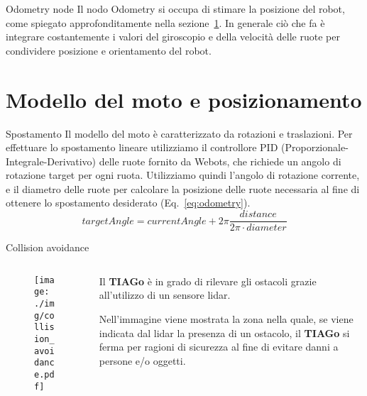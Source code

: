 \documentclass[aspectratio=169, leqno]{beamer}
\begin{document}
	\begin{frame}{Odometry node}
	Il nodo Odometry si occupa di stimare la posizione del
	robot, come spiegato approfonditamente nella
	sezione~\ref{sec:Modello-del-moto-e-posizionamento}. In generale ciò che fa
	è integrare costantemente i valori del giroscopio e della velocità delle
	ruote per condividere posizione e orientamento del robot.
	\end{frame}
	
	

	\section{Modello del moto e posizionamento}\label{sec:Modello-del-moto-e-posizionamento} 
	\frame{\sectionpage}
		
	\begin{frame}{Spostamento}
		Il modello del moto è caratterizzato da rotazioni e traslazioni.
		Per effettuare lo spostamento lineare utilizziamo il controllore PID
		(Proporzionale-Integrale-Derivativo) delle ruote fornito da Webots, che
		richiede un angolo di rotazione target per ogni ruota. Utilizziamo quindi
		l'angolo di rotazione corrente, e il diametro delle ruote per calcolare la
		posizione delle ruote necessaria al fine di ottenere lo spostamento
		desiderato (Eq.~\ref{eq:odometry}).
		\begin{equation}\label{eq:odometry}
		targetAngle =
		currentAngle+2\pi\frac    {distance}
						{2\pi \cdot diameter}
		\end{equation}
	\end{frame}
	
	\begin{frame}{Collision avoidance}
		\begin{columns}
			\begin{column}{0.2\linewidth}
				\begin{figure}[H]
					\centering
					\texttt{[image: ./img/collision\_avoidance.pdf]}
					\label{fig:collision_avoidance}
				\end{figure}
			\end{column}
			\begin{column}{0.8\linewidth}
				\justifying
				Il \textbf{TIAGo} è in grado di rilevare gli ostacoli
				grazie all'utilizzo di un sensore lidar.  

				Nell'immagine viene mostrata la zona nella quale, se
				viene indicata dal lidar la presenza di un ostacolo, il
				\textbf{TIAGo} si ferma per ragioni di sicurezza al fine di
				evitare danni a persone e/o oggetti.
			\end{column}
			
		\end{columns}
	\end{frame}
\end{document}
